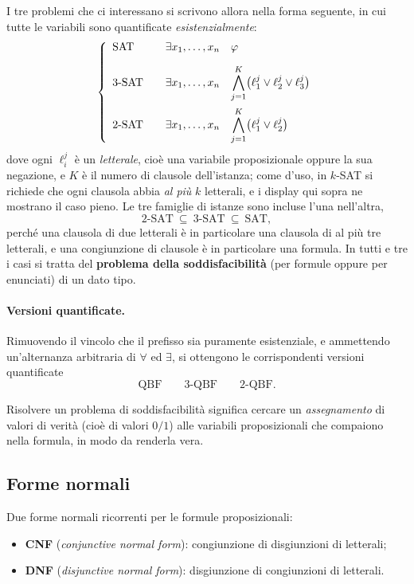 I tre problemi che ci interessano si scrivono allora nella forma seguente, in cui tutte le
variabili sono quantificate \emph{esistenzialmente}:
\[
\left\{
\begin{array}{l@{\qquad}l@{\quad}l}
\text{SAT}   & \exists x_1,\dots,x_n & \varphi\\[10pt]
\text{3-SAT} & \exists x_1,\dots,x_n &
   \displaystyle\bigwedge_{j=1}^{K}\bigl(\ell^{j}_{1}\vee \ell^{j}_{2}\vee \ell^{j}_{3}\bigr)\\[16pt]
\text{2-SAT} & \exists x_1,\dots,x_n &
   \displaystyle\bigwedge_{j=1}^{K}\bigl(\ell^{j}_{1}\vee \ell^{j}_{2}\bigr)
\end{array}
\right.
\]
dove ogni $\ell^{j}_{i}$ è un \emph{letterale}, cioè una variabile proposizionale oppure la
sua negazione, e $K$ è il numero di clausole dell'istanza; come d'uso, in $k$-SAT si richiede
che ogni clausola abbia \emph{al più} $k$ letterali, e i display qui sopra ne mostrano il caso
pieno. Le tre famiglie di istanze sono incluse l'una nell'altra,
\[
\text{2-SAT}\ \subseteq\ \text{3-SAT}\ \subseteq\ \text{SAT},
\]
perché una clausola di due letterali è in particolare una clausola di al più tre letterali, e
una congiunzione di clausole è in particolare una formula. In tutti e tre i casi si tratta del
\textbf{problema della soddisfacibilità} (per formule oppure per enunciati) di un dato tipo.

\paragraph{Versioni quantificate.}
Rimuovendo il vincolo che il prefisso sia puramente esistenziale, e ammettendo un'alternanza
arbitraria di $\forall$ ed $\exists$, si ottengono le corrispondenti versioni quantificate
\[
\text{QBF}\qquad \text{3-QBF}\qquad \text{2-QBF}.
\]

\begin{definizione}[Soddisfacibilità]
Risolvere un problema di soddisfacibilità significa cercare un \emph{assegnamento} di valori
di verità (cioè di valori $0/1$) alle variabili proposizionali che compaiono nella formula, in
modo da renderla vera.
\end{definizione}

\subsection{Forme normali}

Due forme normali ricorrenti per le formule proposizionali:
\begin{itemize}
  \item \textbf{CNF} (\emph{conjunctive normal form}): congiunzione di disgiunzioni di
        letterali;
  \item \textbf{DNF} (\emph{disjunctive normal form}): disgiunzione di congiunzioni di
        letterali.
\end{itemize}

